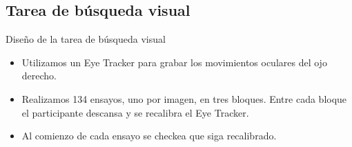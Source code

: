 \documentclass[compress]{beamer}
\begin{document}
\subsection{Tarea de búsqueda visual}
\begin{frame}{Diseño de la tarea de búsqueda visual}

\begin{itemize}
\item Utilizamos un Eye Tracker para grabar los movimientos oculares del ojo derecho.
\item Realizamos 134 ensayos, uno por imagen, en tres bloques. Entre cada bloque el participante descansa y se recalibra el Eye Tracker.
\item Al comienzo de cada ensayo se checkea que siga recalibrado.
\end{itemize}

\end{frame}
\end{document}
